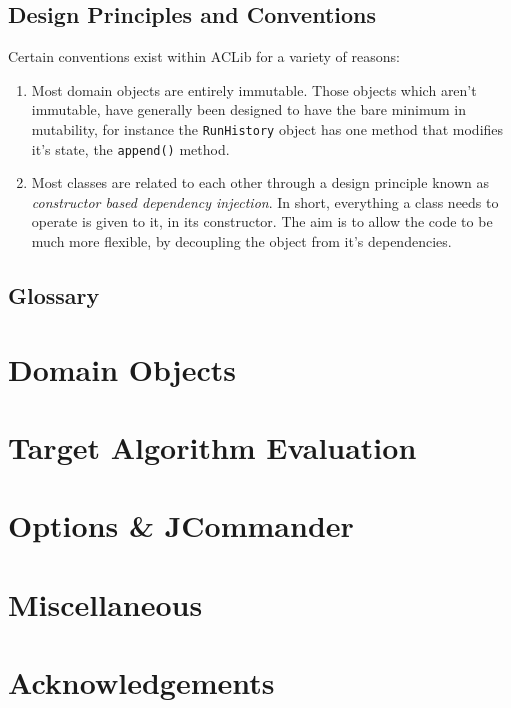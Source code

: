 \documentclass[11pt,letterpaper,oneside]{article}
\begin{document}
\subsection{Design Principles and Conventions}

Certain conventions exist within ACLib for a variety of reasons:

\begin{enumerate}

\item Most domain objects are entirely immutable. Those objects which aren't immutable, have generally been designed to have the bare minimum in mutability, for instance the \texttt{RunHistory} object has one method that modifies it's state, the \texttt{append()} method.

\item Most classes are related to each other through a design principle known as \emph{constructor based dependency injection}. In short, everything a class needs to operate is given to it, in its constructor. The aim is to allow the code to be much more flexible, by decoupling the object from it's dependencies. 

\end{enumerate}


\subsection{Glossary}



\section{Domain Objects}


\section{Target Algorithm Evaluation}

\section{Options \& JCommander}

\section{Miscellaneous}


\section{Acknowledgements}
\end{document}
